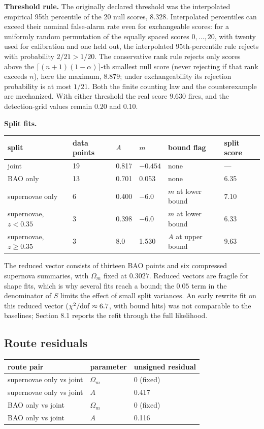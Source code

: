 \textbf{Threshold rule.} The originally declared threshold was the
interpolated empirical 95th percentile of the 20 null scores, \(8.328\).
Interpolated percentiles can exceed their nominal false-alarm rate even
for exchangeable scores: for a uniformly random permutation of the
equally spaced scores \(0,\ldots,20\), with twenty used for calibration
and one held out, the interpolated 95th-percentile rule rejects with
probability \(2/21>1/20\). The conservative rank rule rejects only
scores above the \(\lceil(n+1)(1-\alpha)\rceil\)-th smallest null score
(never rejecting if that rank exceeds \(n\)), here the maximum,
\(8.879\); under exchangeability its rejection probability is at most
\(1/21\). Both the finite counting law and the counterexample are
mechanized. With either threshold the real score \(9.630\) fires, and
the detection-grid values remain \(0.20\) and \(0.10\).

\textbf{Split fits.}

\begin{longtable}[]{@{}llllll@{}}
\toprule
split & data points & \(A\) & \(m\) & bound flag & split
score\tabularnewline
\midrule
\endhead
joint & 19 & 0.817 & \(-0.454\) & none & ---\tabularnewline
BAO only & 13 & 0.701 & 0.053 & none & 6.35\tabularnewline
supernovae only & 6 & 0.400 & \(-6.0\) & \(m\) at lower bound &
7.10\tabularnewline
supernovae, \(z<0.35\) & 3 & 0.398 & \(-6.0\) & \(m\) at lower bound &
6.33\tabularnewline
supernovae, \(z\ge0.35\) & 3 & 8.0 & 1.530 & \(A\) at upper bound &
9.63\tabularnewline
\bottomrule
\end{longtable}
\addtocounter{table}{-1}

The reduced vector consists of thirteen BAO points and six compressed
supernova summaries, with \(\Omega_m\) fixed at \(0.3027\). Reduced
vectors are fragile for shape fits, which is why several fits reach a
bound; the \(0.05\) term in the denominator of \(S\) limits the effect
of small split variances. An early rewrite fit on this reduced vector
(\(\chi^2/{\rm dof}\approx6.7\), with bound hits) was not comparable to
the baselines; Section 8.1 reports the refit through the full
likelihood.

\hypertarget{b.5-route-residuals}{%
\subsection{Route residuals}\label{b.5-route-residuals}}

\begin{longtable}[]{@{}lll@{}}
\toprule
route pair & parameter & unsigned residual\tabularnewline
\midrule
\endhead
supernovae only vs joint & \(\Omega_m\) & 0 (fixed)\tabularnewline
supernovae only vs joint & \(A\) & 0.417\tabularnewline
BAO only vs joint & \(\Omega_m\) & 0 (fixed)\tabularnewline
BAO only vs joint & \(A\) & 0.116\tabularnewline
\bottomrule
\end{longtable}
\addtocounter{table}{-1}

